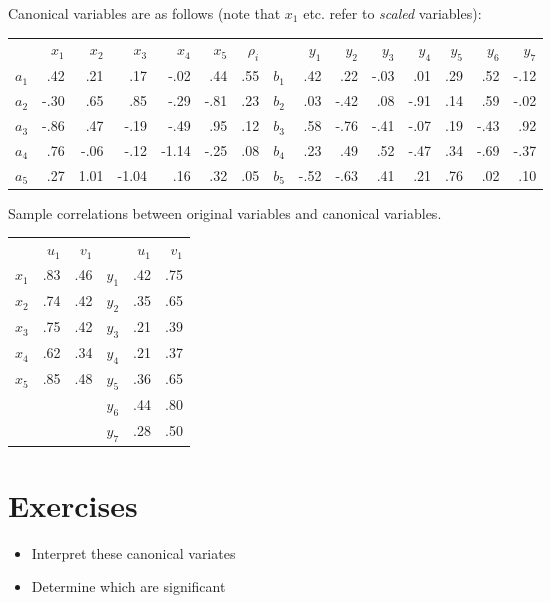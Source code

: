 Canonical variables are as follows (note that $x_{1}$ etc. refer to \emph{scaled} variables):


\begin{tabular}{lrrrrr|r|lrrrrrrr}
\scriptsize
 & $x_{1}$ & $x_{2}$ & $x_{3}$ & $x_{4}$ & $x_{5}$ & $\rho_{i}$ & & $y_{1}$ & $y_{2}$ & $y_{3}$ & $y_{4}$ & $y_{5}$ & $y_{6}$ & $y_{7}$\\
$a_{1}$ & .42 & .21 & .17 & -.02 & .44 & .55 &  $b_{1}$ & .42 & .22 & -.03 & .01 & .29 & .52 & -.12\\
$a_{2}$ & -.30 & .65 & .85 & -.29 & -.81 & .23 & $b_{2}$ & .03 & -.42 & .08 & -.91 & .14 & .59 & -.02\\
$a_{3}$ & -.86 & .47 & -.19 & -.49 & .95 & .12 & $b_{3}$ & .58 & -.76 & -.41 & -.07 & .19 & -.43 & .92\\
$a_{4}$ & .76 & -.06 & -.12 & -1.14 & -.25 & .08 & $b_{4}$ & .23 & .49 & .52 & -.47 & .34 & -.69 & -.37\\
$a_{5}$ & .27 & 1.01 & -1.04 & .16 & .32 & .05 & $b_{5}$ & -.52 & -.63 & .41 & .21 & .76 & .02 & .10 
\end{tabular}


Sample correlations between original variables and canonical variables.

\begin{tabular}{lrr|lrr}
 & $u_{1}$ & $v_{1}$ & & $u_{1}$ & $v_{1}$\\
$x_{1}$ & .83 & .46 & $y_{1}$ & .42 & .75\\
$x_{2}$ & .74 & .42 & $y_{2}$ & .35 & .65\\
$x_{3}$ & .75 & .42 & $y_{3}$ & .21 & .39\\
$x_{4}$ & .62 & .34 & $y_{4}$ & .21 & .37\\
$x_{5}$ & .85 & .48 & $y_{5}$ & .36 & .65\\
 & & & $y_{6}$ & .44 & .80\\
 & & & $y_{7}$ & .28 & .50
 \end{tabular}


\section{Exercises}

\begin{itemize}
\item Interpret these canonical variates
\item Determine which are significant
\end{itemize}


